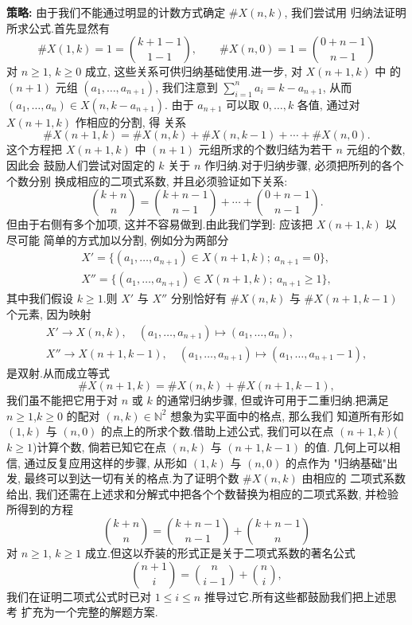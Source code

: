 \noindent\textbf{策略:} 由于我们不能通过明显的计数方式确定 $\#X(n, k)$, 我们尝试用
归纳法证明所求公式.首先显然有
\[
\#X(1, k) = 1 = \binom{k + 1 - 1}{1 - 1}, \qquad
\#X(n, 0) = 1 = \binom{0 + n - 1}{n - 1}
\]
对 $n \geq 1$, $k \geq 0$ 成立, 这些关系可供归纳基础使用.进一步, 对 $X(n+1, k)$ 中
的 $(n+1)$ 元组 $(a_1, \ldots, a_{n+1})$, 我们注意到
$\sum_{i=1}^{n} a_i = k - a_{n+1}$, 从而 $(a_1, \ldots, a_n) \in X(n, k - a_{n+1})$.
由于 $a_{n+1}$ 可以取 $0, \ldots, k$ 各值, 通过对 $X(n+1, k)$ 作相应的分割, 得
关系
\[
\#X(n+1, k) = \#X(n, k) + \#X(n, k-1) + \cdots + \#X(n, 0)\text{.}
\]
这个方程把 $X(n+1, k)$ 中 $(n+1)$ 元组所求的个数归结为若干 $n$ 元组的个数, 因此会
鼓励人们尝试对固定的 $k$ 关于 $n$ 作归纳.对于归纳步骤, 必须把所列的各个个数分别
换成相应的二项式系数, 并且必须验证如下关系:
\[
\binom{k + n}{n} = \binom{k + n - 1}{n - 1} + \cdots + \binom{0 + n - 1}{n - 1}\text{.}
\]
但由于右侧有多个加项, 这并不容易做到.由此我们学到: 应该把 $X(n+1, k)$ 以尽可能
简单的方式加以分割, 例如分为两部分
\[
\begin{array}{l}
X' = \bigl\{ (a_1, \ldots, a_{n+1}) \in X(n+1, k) ;\ a_{n+1} = 0 \bigr\}, \\
X'' = \bigl\{ (a_1, \ldots, a_{n+1}) \in X(n+1, k) ;\ a_{n+1} \geq 1 \bigr\},
\end{array}
\]
其中我们假设 $k \geq 1$.则 $X'$ 与 $X''$ 分别恰好有 $\#X(n, k)$ 与
$\#X(n+1, k-1)$ 个元素, 因为映射
\[
\begin{array}{l}
X' \longrightarrow X(n, k), \quad (a_1, \ldots, a_{n+1}) \longmapsto (a_1, \ldots, a_n), \\
X'' \longrightarrow X(n+1, k-1), \quad (a_1, \ldots, a_{n+1}) \longmapsto (a_1, \ldots, a_{n+1} - 1),
\end{array}
\]
是双射.从而成立等式
\[
\#X(n+1, k) = \#X(n, k) + \#X(n+1, k-1),
\]
我们虽不能把它用于对 $n$ 或 $k$ 的通常归纳步骤, 但或许可用于二重归纳.把满足
$n \geq 1$,$k \geq 0$ 的配对 $(n, k) \in \mathbb{N}^2$ 想象为实平面中的格点, 那么我们
知道所有形如 $(1, k)$ 与 $(n, 0)$ 的点上的所求个数.借助上述公式, 我们可以在点
$(n+1, k)$($k \geq 1$)计算个数, 倘若已知它在点 $(n, k)$ 与 $(n+1, k-1)$ 的值.
几何上可以相信, 通过反复应用这样的步骤, 从形如 $(1, k)$ 与 $(n, 0)$ 的点作为
"归纳基础"出发, 最终可以到达一切有关的格点.为了证明个数 $\#X(n, k)$ 由相应的
二项式系数给出, 我们还需在上述求和分解式中把各个个数替换为相应的二项式系数, 并检验
所得到的方程
\[
\binom{k + n}{n} = \binom{k + n - 1}{n - 1} + \binom{k + n - 1}{n}
\]
对 $n \geq 1$, $k \geq 1$ 成立.但这以乔装的形式正是关于二项式系数的著名公式
\[
\binom{n+1}{i} = \binom{n}{i-1} + \binom{n}{i},
\]
我们在证明二项式公式时已对 $1 \leq i \leq n$ 推导过它.所有这些都鼓励我们把上述思考
扩充为一个完整的解题方案.

